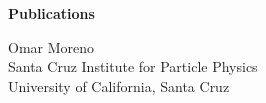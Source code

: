 \documentclass[11pt]{article}
\begin{document}
    \centerline{\Large{\textcolor{indigodye}{\textbf{Publications}}}}
    \begin{center}
        Omar Moreno                                 \\ 
        Santa Cruz Institute for Particle Physics   \\
        University of California, Santa Cruz 
    \end{center}

    
    
    \nocite{*}

\end{document}
